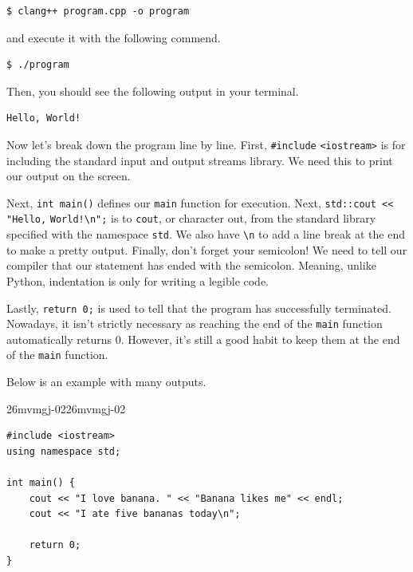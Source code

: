 \documentclass[../../../main.tex]{subfiles}
\begin{document}
\begin{basicbox}
\begin{lstlisting}[style=basic]
$ clang++ program.cpp -o program
\end{lstlisting}
\end{basicbox}

and execute it with the following commend.

\begin{basicbox}
\begin{lstlisting}[style=basic]
$ ./program
\end{lstlisting}
\end{basicbox}

Then, you should see the following output in your terminal.

\begin{outputbox}
\begin{lstlisting}[style=basic]
Hello, World!
\end{lstlisting}
\end{outputbox}

Now let's break down the program line by line. First, \verb|#include|
\newline \verb|<iostream>| is for including the standard input and
output streams library. We need this to print our output on the
screen.

Next, \verb|int main()| defines our \verb|main| function for
execution. Next, \verb|std::cout << "Hello,| \verb|World!\n";| is to
\verb|cout|, or character out, from the standard library specified
with the namespace \verb|std|. We also have \verb|\n| to add a line
break at the end to make a pretty output. Finally, don't forget your
semicolon! We need to tell our compiler that our statement has ended
with the semicolon. Meaning, unlike Python, indentation is only for
writing a legible code.

Lastly, \verb|return 0;| is used to tell that the program has
successfully terminated. Nowadays, it isn't strictly necessary as
reaching the end of the \verb|main| function automatically returns
$0$. However, it's still a good habit to keep them at the end of the
\verb|main| function.

Below is an example with many outputs.

\begin{cppbox}{26mvmgj-02}{26mvmgj-02}
\begin{lstlisting}[style=cppstyle]
#include <iostream>
using namespace std;

int main() {
    cout << "I love banana. " << "Banana likes me" << endl;
    cout << "I ate five bananas today\n";

    return 0;
}
\end{lstlisting}
\end{cppbox}
\end{document}
